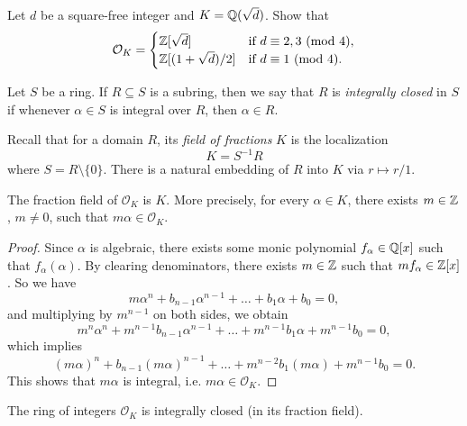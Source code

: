 \begin{exercise}
  Let $d$ be a square-free integer and
  $K = \mathbb{Q}(\sqrt{d})$. Show that
  \[
    \mathcal{O}_K =
    \begin{cases}
      \mathbb{Z}[\sqrt{d}] & \text{if $d \equiv 2, 3 \ (\mathrm{mod}\ 4)$}, \\
      \mathbb{Z}[(1 + \sqrt{d}) / 2] & \text{if $d \equiv 1 \ (\mathrm{mod}\ 4)$}.
    \end{cases}
  \]
\end{exercise}

\begin{definition}
  Let $S$ be a ring.
  If $R \subseteq S$ is a subring, then we say that
  $R$ is \emph{integrally closed} in $S$ if whenever
  $\alpha \in S$ is integral over $R$, then
  $\alpha \in R$.
\end{definition}

\begin{remark}
  Recall that for a domain $R$, its \emph{field of fractions} $K$ is the
  localization
  \[
    K = S^{-1} R
  \]
  where $S = R \setminus \{0\}$. There is a natural
  embedding of $R$ into $K$ via $r \mapsto r / 1$.
\end{remark}

\begin{lemma}
  The fraction field of $\mathcal{O}_K$ is $K$. More
  precisely, for every $\alpha \in K$, there exists
  $m \in \mathbb{Z}$, $m \ne 0$, such that $m\alpha \in \mathcal{O}_K$.
\end{lemma}

\begin{proof}
  Since $\alpha$ is algebraic, there exists some monic
  polynomial $f_\alpha \in \mathbb{Q}[x]$ such that
  $f_\alpha(\alpha)$. By clearing denominators, there
  exists $m \in \mathbb{Z}$ such that $mf_\alpha \in \mathbb{Z}[x]$.
  So we have
  \[
    m \alpha^n + b_{n - 1} \alpha^{n - 1} + \dots + b_1 \alpha + b_0 = 0,
  \]
  and multiplying by $m^{n - 1}$ on both sides, we obtain
  \[
    m^n \alpha^n + m^{n - 1} b_{n - 1} \alpha^{n - 1} + \dots + m^{n - 1} b_1 \alpha + m^{n - 1} b_0 = 0,
  \]
  which implies
  \[
    (m\alpha)^n + b_{n - 1} (m\alpha)^{n - 1} + \dots + m^{n - 2} b_1 (m\alpha) + m^{n - 1} b_0 = 0.
  \]
  This shows that $m\alpha$ is integral, i.e.
  $m\alpha \in \mathcal{O}_K$.
\end{proof}

\begin{theorem}
  The ring of integers $\mathcal{O}_K$ is
  integrally closed (in its fraction field).
\end{theorem}

